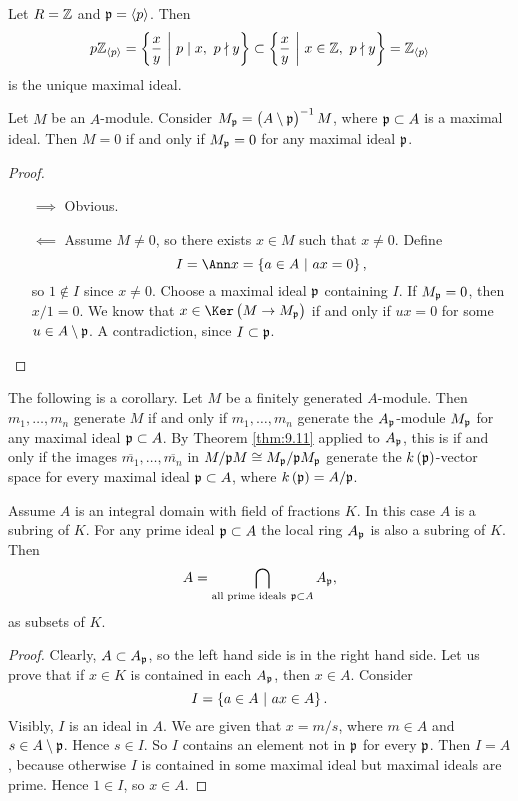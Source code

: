 \begin{example}
Let $ R = \mathbb{Z} $ and $ \mathfrak{p} = \left\langle p \right\rangle $. Then
$$ p\ZZ_{\abr{p}} = \cbr{\dfrac{x}{y} \st p \mid x, \ p \nmid y} \subset \cbr{\dfrac{x}{y} \st x \in \ZZ, \ p \nmid y} = \ZZ_{\abr{p}} $$
is the unique maximal ideal.
\end{example}

\begin{proposition}
Let $ M $ be an $ A $-module. Consider $ M_\ppp = \br{A \setminus \ppp}^{-1}M $, where $ \mathfrak{p} \subset A $ is a maximal ideal. Then $ M = 0 $ if and only if $ M_{\mathfrak{p}} = 0 $ for any maximal ideal $ \mathfrak{p} $.
\end{proposition}

\begin{proof}
\hfill
\begin{itemize}
\item[$ \implies $] Obvious.
\item[$ \impliedby $] Assume $ M \ne 0 $, so there exists $ x \in M $ such that $ x \ne 0 $. Define
$$ I = \Ann x = \cbr{a \in A \st ax = 0}, $$
so $ 1 \notin I $ since $ x \ne 0 $. Choose a maximal ideal $ \mathfrak{p} $ containing $ I $. If $ M_{\mathfrak{p}} = 0 $, then $ x / 1 = 0 $. We know that $ x \in \Ker \br{M \to M_\ppp} $ if and only if $ ux = 0 $ for some $ u \in A \setminus \mathfrak{p} $. A contradiction, since $ I \subset \mathfrak{p} $.
\end{itemize}
\end{proof}

The following is a corollary. Let $ M $ be a finitely generated $ A $-module. Then $ m_1, \dots, m_n $ generate $ M $ if and only if $ m_1, \dots, m_n $ generate the $ A_{\mathfrak{p}} $-module $ M_{\mathfrak{p}} $ for any maximal ideal $ \mathfrak{p} \subset A $. By Theorem \ref{thm:9.11} applied to $ A_{\mathfrak{p}} $, this is if and only if the images $ \overline{m_1}, \dots, \overline{m_n} $ in $ M / \mathfrak{p} M \cong M_{\mathfrak{p}} / \mathfrak{p} M_{\mathfrak{p}} $ generate the $ k\br{\ppp} $-vector space for every maximal ideal $ \mathfrak{p} \subset A $, where $ k\br{\ppp} = A / \ppp $.

\begin{corollary}
Assume $ A $ is an integral domain with field of fractions $ K $. In this case $ A $ is a subring of $ K $. For any prime ideal $ \mathfrak{p} \subset A $ the local ring $ A_{\mathfrak{p}} $ is also a subring of $ K $. Then
$$ A = \bigcap_{\text{all prime ideals} \ \ppp \subset A} A_\ppp, $$
as subsets of $ K $.
\end{corollary}

\begin{proof}
Clearly, $ A \subset A_{\mathfrak{p}} $, so the left hand side is in the right hand side. Let us prove that if $ x \in K $ is contained in each $ A_{\mathfrak{p}} $, then $ x \in A $. Consider
$$ I = \cbr{a \in A \st ax \in A}. $$
Visibly, $ I $ is an ideal in $ A $. We are given that $ x = m / s $, where $ m \in A $ and $ s \in A \setminus \mathfrak{p} $. Hence $ s \in I $. So $ I $ contains an element not in $ \mathfrak{p} $ for every $ \mathfrak{p} $. Then $ I = A $, because otherwise $ I $ is contained in some maximal ideal but maximal ideals are prime. Hence $ 1 \in I $, so $ x \in A $.
\end{proof}

